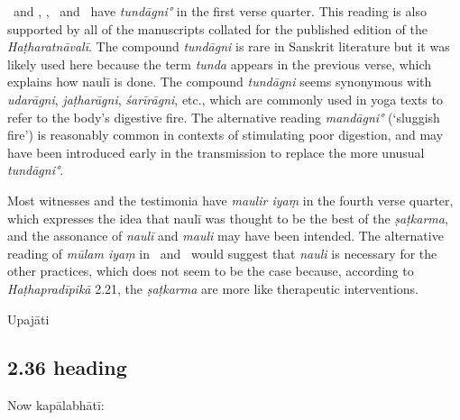 \begin{ekdosis}
\begin{testimonia}[hp02_035]
\end{testimonia}

\begin{philcomm}[hp02_035]
\alphaOne\ and \alphaTwo, \betaTwo, \epsilonOne\ and \zetaOne\ have \emph{tundāgni°} in the first verse quarter. This reading is also supported by all of the manuscripts collated for the published edition of the \emph{Haṭharatnāvalī}. The compound \emph{tundāgni} is rare in Sanskrit literature but it was likely used here because the term \emph{tunda} appears in the previous verse, which explains how naulī is done. The compound \emph{tundāgni} seems synonymous with \emph{udarāgni}, \emph{jaṭharāgni}, \emph{śarīrāgni}, etc., which are commonly used in yoga texts to refer to the body's digestive fire. The alternative reading \emph{mandāgni°} (`sluggish fire') is reasonably common in contexts of stimulating poor digestion, and may have been introduced early in the transmission to replace the more unusual \emph{tundāgni°}. \lb


Most witnesses and the testimonia have \emph{maulir iyaṃ} in the fourth verse quarter, which expresses the idea that naulī was thought to be the best of the \emph{ṣaṭkarma}, and the assonance of \emph{naulī} and \emph{mauli} may have been intended. The alternative reading of \emph{mūlam iyaṃ} in \zetaOne\ and \etaOne\ would suggest that \emph{nauli} is necessary for the other practices, which does not seem to be the case because, according to \emph{Haṭhapradīpikā} 2.21, the \emph{ṣaṭkarma} are more like therapeutic interventions.
\end{philcomm}

\begin{metre}[hp02_035]
Upajāti
\end{metre}

\subsection*{2.36 heading}
\begin{translation}[hp02_036a]
Now kapālabhātī:
\end{translation}



\end{ekdosis}
